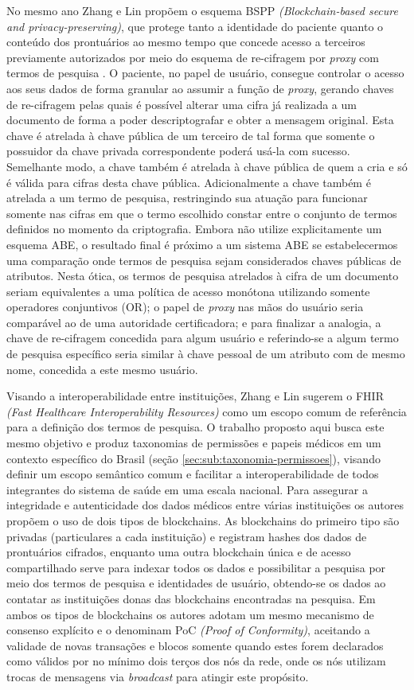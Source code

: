 \documentclass[a4paper,11pt]{article}
\begin{document}
No mesmo ano Zhang e Lin \cite{Zhang2018} propõem o esquema BSPP \emph{(Blockchain-based secure and privacy-preserving)}, que protege tanto a identidade do paciente quanto o conteúdo dos prontuários ao mesmo tempo que concede acesso a terceiros previamente autorizados por meio do esquema de re-cifragem por \emph{proxy} com termos de pesquisa \cite{Wang2012}.
O paciente, no papel de usuário, consegue controlar o acesso aos seus dados de forma granular ao assumir a função de \emph{proxy}, gerando chaves de re-cifragem pelas quais é possível alterar uma cifra já realizada a um documento de forma a poder descriptografar e obter a mensagem original.
Esta chave é atrelada à chave pública de um terceiro de tal forma que somente o possuidor da chave privada correspondente poderá usá-la com sucesso.
Semelhante modo, a chave também é atrelada à chave pública de quem a cria e só é válida para cifras desta chave pública.
Adicionalmente a chave também é atrelada a um termo de pesquisa, restringindo sua atuação para funcionar somente nas cifras em que o termo escolhido constar entre o conjunto de termos definidos no momento da criptografia.
Embora não utilize explicitamente um esquema ABE, o resultado final é próximo a um sistema ABE se estabelecermos uma comparação onde termos de pesquisa sejam considerados chaves públicas de atributos.
Nesta ótica, os termos de pesquisa atrelados à cifra de um documento seriam equivalentes a uma política de acesso monótona utilizando somente operadores conjuntivos (OR); o papel de \emph{proxy} nas mãos do usuário seria comparável ao de uma autoridade certificadora; e para finalizar a analogia, a chave de re-cifragem concedida para algum usuário e referindo-se a algum termo de pesquisa específico seria similar à chave pessoal de um atributo com de mesmo nome, concedida a este mesmo usuário.

Visando a interoperabilidade entre instituições, Zhang e Lin sugerem o FHIR \emph{(Fast Healthcare Interoperability Resources)} \cite{HL72019} como um escopo comum de referência para a definição dos termos de pesquisa.
O trabalho proposto aqui busca este mesmo objetivo e produz taxonomias de permissões e papeis médicos em um contexto específico do Brasil (seção \ref{sec:sub:taxonomia-permissoes}), visando definir um escopo semântico comum e facilitar a interoperabilidade de todos integrantes do sistema de saúde em uma escala nacional.
Para assegurar a integridade e autenticidade dos dados médicos entre várias instituições os autores propõem o uso de dois tipos de blockchains.
As blockchains do primeiro tipo são privadas (particulares a cada instituição) e registram hashes dos dados de prontuários cifrados, enquanto uma outra blockchain única e de acesso compartilhado serve para indexar todos os dados e possibilitar a pesquisa por meio dos termos de pesquisa e identidades de usuário, obtendo-se os dados ao contatar as instituições donas das blockchains encontradas na pesquisa.
Em ambos os tipos de blockchains os autores adotam um mesmo mecanismo de consenso explícito e o denominam PoC \emph{(Proof of Conformity)}, aceitando a validade de novas transações e blocos somente quando estes forem declarados como válidos por no mínimo dois terços dos nós da rede, onde os nós utilizam trocas de mensagens via \emph{broadcast} para atingir este propósito.
\end{document}
